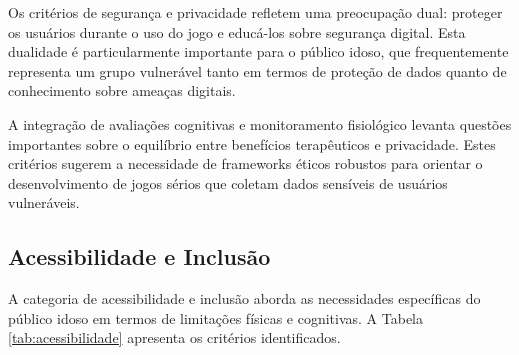Os critérios de segurança e privacidade refletem uma preocupação dual: proteger os usuários durante o uso do jogo e educá-los sobre segurança digital. Esta dualidade é particularmente importante para o público idoso, que frequentemente representa um grupo vulnerável tanto em termos de proteção de dados quanto de conhecimento sobre ameaças digitais.

A integração de avaliações cognitivas e monitoramento fisiológico levanta questões importantes sobre o equilíbrio entre benefícios terapêuticos e privacidade. Estes critérios sugerem a necessidade de frameworks éticos robustos para orientar o desenvolvimento de jogos sérios que coletam dados sensíveis de usuários vulneráveis.

\subsection{Acessibilidade e Inclusão}
\label{subsec:acessibilidade}

A categoria de acessibilidade e inclusão aborda as necessidades específicas do público idoso em termos de limitações físicas e cognitivas. A Tabela \ref{tab:acessibilidade} apresenta os critérios identificados.

